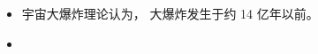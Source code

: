 
\begin{issues}
\issueDraft
\end{issues}

\begin{itemize}
\item 宇宙大爆炸理论认为， 大爆炸发生于约 14 亿年以前。
\item 
\end{itemize}
